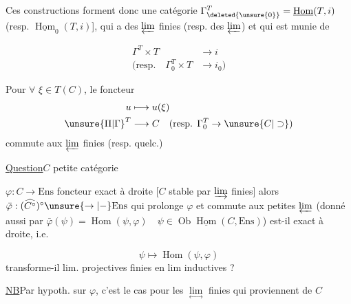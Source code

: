 Ces constructions  forment donc une catégorie $\Gamma^T_{\deleted{\unsure{0}}}=\underline{\operatorname{Hom}}(T,i)$ (resp. $\underline{\operatorname{Hom}}_0(T,i)$], qui a des $\varprojlim$ finies (resp. des $\varprojlim$) et qui est munie de

\[\begin{aligned}\Gamma^T\times T&\longrightarrow i\\(\text{resp.}\quad\Gamma_0^T\times T&\longrightarrow i_0)\end{aligned}\]

Pour $\forall$  $\xi\in T(C)$, le foncteur
\[\begin{aligned}u&\longmapsto u(\xi)\\{\unsure{\Pi|\Gamma}}^{T}&\longrightarrow C\quad(\text{resp. }\Gamma_0^{T}\to \unsure{C|\supset})\end{aligned}\]
commute aux $\varprojlim$ finies  (resp. quelc.)


\uline{Question}\qquad $C$ petite catégorie

$\varphi:C\longrightarrow\mathrm{Ens}$ foncteur exact à droite [$C$ stable par $\varinjlim$ finies] alors $\bar\varphi:(\widehat{C^\circ})^\circ\unsure{\to|{-}}\mathrm{Ens}$ qui prolonge $\varphi$ et commute aux petites $\varprojlim$ (donné aussi par $\bar\varphi(\psi)=\operatorname{Hom}(\psi,\varphi)\quad\psi\in\operatorname{Ob}\underline{\operatorname{Hom}}(C,\mathrm{Ens})$) est-il exact à droite, i.e.


\[\psi\longmapsto\operatorname{Hom}(\psi,\varphi)\]
transforme-il lim. projectives finies en lim inductives ?

\uline{NB}\quad Par hypoth. sur $\varphi$, c'est le cas pour les $\underset{\longleftrightarrow}{\lim}$ finies qui proviennent de $C$

